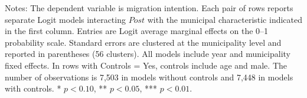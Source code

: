 \begin{table}[!htbp]
\begin{tabular}{llc}
\hline
\end{tabular}
\par\vspace{1.5mm}
\begin{minipage}{\textwidth}
{\footnotesize Notes: The dependent variable is migration intention. Each pair of rows reports separate Logit models interacting \(Post\) with the municipal characteristic indicated in the first column. Entries are Logit average marginal effects on the 0--1 probability scale. Standard errors are clustered at the municipality level and reported in parentheses (56 clusters). All models include year and municipality fixed effects. In rows with Controls = Yes, controls include age and male. The number of observations is        7,503 in models without controls and        7,448 in models with controls. * \(p<0.10\), ** \(p<0.05\), *** \(p<0.01\).}
\end{minipage}
\end{table}
